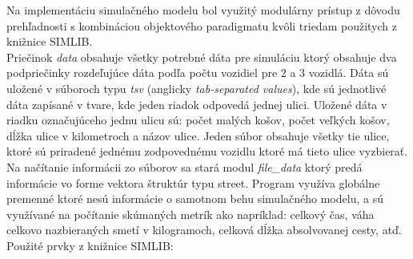\documentclass[11pt,a4paper]{article}
\begin{document}
    \indent Na implementáciu simulačného modelu bol využitý modulárny prístup z dôvodu prehľadnosti s kombináciou objektového paradigmatu kvôli triedam použitych z knižnice SIMLIB.\\[0.4em]
    \indent Priečinok \textit{data} obsahuje všetky potrebné dáta pre simuláciu ktorý obsahuje dva podpriečinky rozdeľujúce dáta podľa počtu vozidiel pre 2 a 3 vozidlá. Dáta sú uložené v súboroch typu \textit{tsv} (anglicky \textit{tab-separated values}), kde sú jednotlivé dáta zapísané v tvare, kde jeden riadok odpovedá jednej ulici. Uložené dáta v riadku označujúceho jednu ulicu sú: počet malých košov, počet veľkých košov, dĺžka ulice v kilometroch a názov ulice. Jeden súbor obsahuje všetky tie ulice, ktoré sú priradené jednému zodpovednému vozidlu ktoré má tieto ulice vyzbierať.\\[0.4em]
    \indent Na načítanie informácii zo súborov sa stará modul \textit{file\_data} ktorý predá informácie vo forme vektora štruktúr typu street. Program využíva globálne premenné ktoré nesú informácie o samotnom behu simulačného modelu, a sú využívané na počítanie skúmaných metrík ako napríklad: celkový čas, váha celkovo nazbieraných smetí v kilogramoch, celková dĺžka absolvovanej cesty, atď.\\[0.4em]
    \noindent Použité prvky z knižnice SIMLIB:
\end{document}
